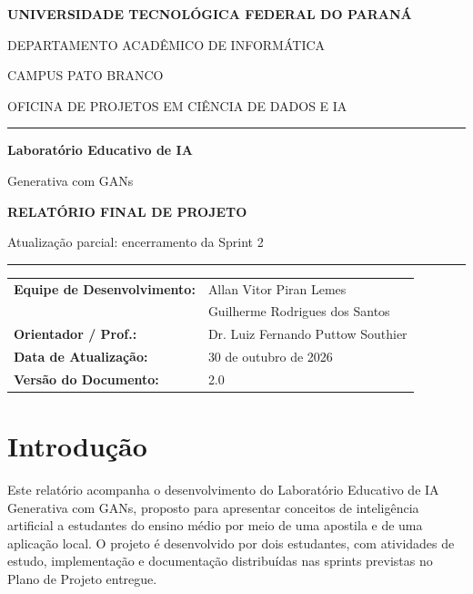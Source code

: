 \documentclass[12pt,a4paper]{article}
\renewcommand{\arraystretch}{1.2}
\begin{document}
\renewcommand{\contentsname}{Sumário}
\renewcommand{\refname}{Referências}

\begin{titlepage}
\thispagestyle{fancy}
\centering
\vspace*{0.7cm}
{\Large\bfseries UNIVERSIDADE TECNOLÓGICA FEDERAL DO PARANÁ\par}
\vspace{0.15cm}
{\large DEPARTAMENTO ACADÊMICO DE INFORMÁTICA\par}
\vspace{0.1cm}
{\small CAMPUS PATO BRANCO\par}
\vspace{0.1cm}
{\small OFICINA DE PROJETOS EM CIÊNCIA DE DADOS E IA\par}
\vspace{1.6cm}
\noindent\rule{\textwidth}{1pt}\par
\vspace{0.2cm}
{\Huge\bfseries\color{azulProfessor}Laboratório Educativo de IA\par Generativa com GANs\par}
\vspace{0.35cm}
{\large\bfseries RELATÓRIO FINAL DE PROJETO\par}
\vspace{0.25cm}
{\small Atualização parcial: encerramento da Sprint 2\par}
\vspace{0.45cm}
\noindent\rule{\textwidth}{1pt}\par
\vspace{1.2cm}
{\renewcommand{\arraystretch}{1.05}
\begin{tabular}{@{}ll@{}}
\textbf{Equipe de Desenvolvimento:} & Allan Vitor Piran Lemes \\
 & Guilherme Rodrigues dos Santos \\
\textbf{Orientador / Prof.:} & Dr. Luiz Fernando Puttow Southier \\
\textbf{Data de Atualização:} & 30 de outubro de 2026 \\
\textbf{Versão do Documento:} & 2.0 \\
\end{tabular}\par}
\end{titlepage}
\setcounter{page}{2}
\tableofcontents
\clearpage

\section{Introdução}
Este relatório acompanha o desenvolvimento do Laboratório Educativo de IA Generativa com GANs, proposto para apresentar conceitos de inteligência artificial a estudantes do ensino médio por meio de uma apostila e de uma aplicação local. O projeto é desenvolvido por dois estudantes, com atividades de estudo, implementação e documentação distribuídas nas sprints previstas no Plano de Projeto entregue.
\end{document}

